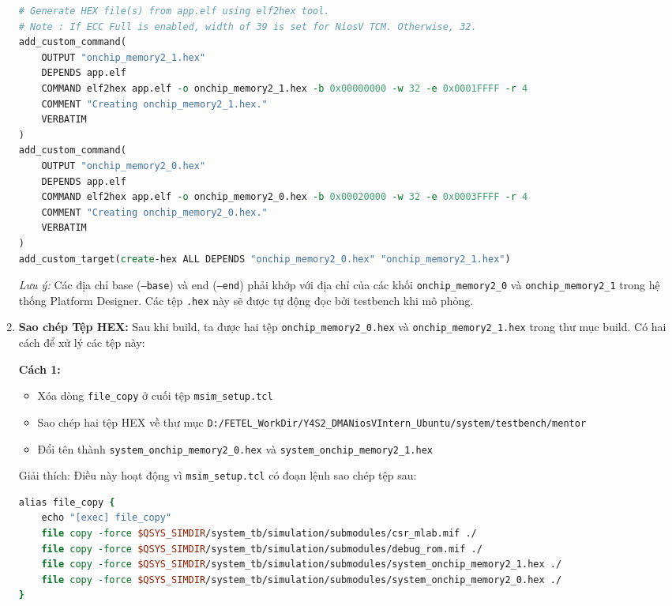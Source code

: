 \begin{enumerate}
    \begin{lstlisting}[language=tcl, caption={CMakeLists.txt}, label={lst:CMakeLists_create-hex}]
# Generate HEX file(s) from app.elf using elf2hex tool.
# Note : If ECC Full is enabled, width of 39 is set for NiosV TCM. Otherwise, 32.
add_custom_command(
    OUTPUT "onchip_memory2_1.hex"
    DEPENDS app.elf
    COMMAND elf2hex app.elf -o onchip_memory2_1.hex -b 0x00000000 -w 32 -e 0x0001FFFF -r 4
    COMMENT "Creating onchip_memory2_1.hex."
    VERBATIM
)
add_custom_command(
    OUTPUT "onchip_memory2_0.hex"
    DEPENDS app.elf
    COMMAND elf2hex app.elf -o onchip_memory2_0.hex -b 0x00020000 -w 32 -e 0x0003FFFF -r 4
    COMMENT "Creating onchip_memory2_0.hex."
    VERBATIM
)
add_custom_target(create-hex ALL DEPENDS "onchip_memory2_0.hex" "onchip_memory2_1.hex") \end{lstlisting}
        
    \textit{Lưu ý:} Các địa chỉ base (\texttt{--base}) và end (\texttt{--end}) phải khớp với địa chỉ của các khối \texttt{onchip\_memory2\_0} và \texttt{onchip\_memory2\_1} trong hệ thống Platform Designer. Các tệp \texttt{.hex} này sẽ được tự động đọc bởi testbench khi mô phỏng.

    \item \textbf{Sao chép Tệp HEX:} Sau khi build, ta được hai tệp \texttt{onchip\_memory2\_0.hex} và \texttt{onchip\_memory2\_1.hex} trong thư mục build. Có hai cách để xử lý các tệp này:

    \textbf{Cách 1:}
    \begin{itemize}
        \item Xóa dòng \texttt{file\_copy} ở cuối tệp \texttt{msim\_setup.tcl}
        \item Sao chép hai tệp HEX về thư mục \texttt{D:/FETEL\_WorkDir/Y4S2\_DMANiosVIntern\_Ubuntu/system/testbench/mentor}
        \item Đổi tên thành \texttt{system\_onchip\_memory2\_0.hex} và \texttt{system\_onchip\_memory2\_1.hex}
    \end{itemize}

    Giải thích: Điều này hoạt động vì \texttt{msim\_setup.tcl} có đoạn lệnh sao chép tệp sau:
    \begin{lstlisting}[language=tcl]
alias file_copy {
    echo "[exec] file_copy"  
    file copy -force $QSYS_SIMDIR/system_tb/simulation/submodules/csr_mlab.mif ./
    file copy -force $QSYS_SIMDIR/system_tb/simulation/submodules/debug_rom.mif ./  
    file copy -force $QSYS_SIMDIR/system_tb/simulation/submodules/system_onchip_memory2_1.hex ./
    file copy -force $QSYS_SIMDIR/system_tb/simulation/submodules/system_onchip_memory2_0.hex ./
}
    \end{lstlisting}


\end{enumerate}
